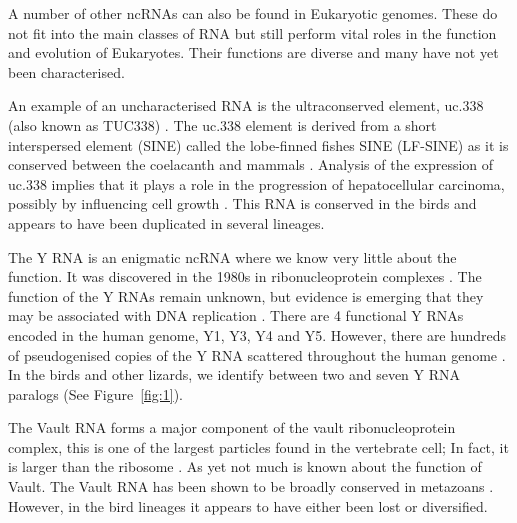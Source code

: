 \documentclass[10pt]{bmc_article}
\newenvironment{bmcformat}{\begin{raggedright}\baselineskip20pt\sloppy\setboolean{publ}{false}}{\end{raggedright}\baselineskip20pt\sloppy}
\begin{document}
\begin{bmcformat}

A number of other ncRNAs can also be found in Eukaryotic
genomes. These do not fit into the main classes of RNA but still
perform vital roles in the function and evolution of Eukaryotes.
Their functions are diverse and many have not yet been characterised.

An example of an uncharacterised RNA is the ultraconserved element,
uc.338 (also known as TUC338)
\cite{Bejerano:2004,Bejerano:2006,Braconi:2011}. The uc.338 element
is derived from a short interspersed element (SINE) called the
lobe-finned fishes SINE (LF-SINE) as it is conserved between the
coelacanth and mammals \cite{Bejerano:2006}. Analysis of the
expression of uc.338 implies that it plays a role in the progression
of hepatocellular carcinoma, possibly by influencing cell growth
\cite{Braconi:2011}. This RNA is conserved in the birds and appears to
have been duplicated in several lineages.

The Y RNA is an enigmatic ncRNA where we know very little about the
function. It was discovered in the 1980s in ribonucleoprotein
complexes \cite{Lerner:1981}. The function of the Y RNAs remain
unknown, but evidence is emerging that they may be associated with DNA
replication \cite{Christov:2006}. There are 4 functional Y RNAs
encoded in the human genome, Y1, Y3, Y4 and Y5. However, there are
hundreds of pseudogenised copies of the Y RNA scattered throughout the
human genome \cite{Mosig:2007}. In the birds and other lizards, we
identify between two and seven Y RNA paralogs (See
Figure~\ref{fig:1}).

The Vault RNA forms a major component of the vault ribonucleoprotein
complex, this is one of the largest particles found in the vertebrate
cell; In fact, it is larger than the ribosome \cite{Kong:1999}. As yet
not much is known about the function of Vault. The Vault RNA has been
shown to be broadly conserved in metazoans
\cite{Stadler:2009}. However, in the bird lineages it appears to have
either been lost or diversified.





\end{bmcformat}
\end{document}
